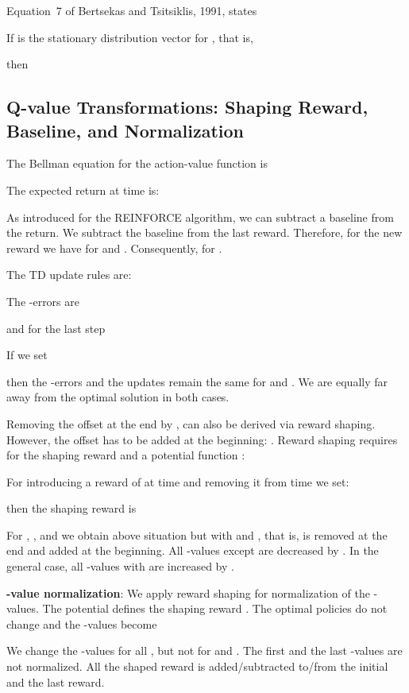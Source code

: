 \documentclass{article}
\begin{document}
\begin{appendices}
Equation~7 of Bertsekas and Tsitsiklis, 1991, \cite{Bertsekas:91}
states


If  is the stationary distribution vector for , that is,

then




\subsection{Q-value Transformations: Shaping Reward, Baseline, and Normalization}
\label{sec:qtransform}

The Bellman equation for the action-value function  is


The expected return at time  is:

As introduced for the REINFORCE algorithm,
we can subtract a baseline  from the return.
We subtract the baseline  from the last reward.
Therefore, for the new reward 
we have  for  and
.
Consequently,  for .


The TD update rules are:

The -errors are

and for the last step


If we set 

then the -errors and the updates remain the same for  and .
We are equally far away from the optimal solution in both cases.





Removing the offset  at the end by ,
can also be derived via reward shaping.
However, the offset has to be added at the beginning: .
Reward shaping requires for the shaping reward  and a potential
function  \cite{Ng:99,Wiewiora:03}:


For introducing a reward of  at time  and removing
it from time  we set:

then the shaping reward is


For , , and  we obtain above situation but with
 and ,
that is,  is removed at the end and
added at the beginning. All -values except  are
decreased by .
In the general case,
all -values  with
 are increased by .


{\bf -value normalization}:
We apply reward shaping \cite{Ng:99,Wiewiora:03} for normalization of
the -values.
The potential  defines the shaping reward
.
The optimal policies do not change and the -values become

We change the -values for all , but not
for  and . The first and the last -values are not normalized.
All the shaped reward is added/subtracted to/from the initial and the
last reward.


\end{appendices}
\end{document}
